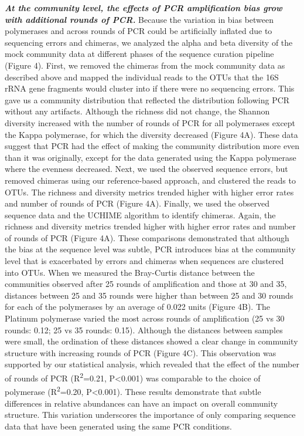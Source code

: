 \documentclass[11pt,]{article}
\begin{document}
\textbf{\emph{At the community level, the effects of PCR amplification
bias grow with additional rounds of PCR.}} Because the variation in bias
between polymerases and across rounds of PCR could be artificially
inflated due to sequencing errors and chimeras, we analyzed the alpha
and beta diversity of the mock community data at different phases of the
sequence curation pipeline (Figure 4). First, we removed the chimeras
from the mock community data as described above and mapped the
individual reads to the OTUs that the 16S rRNA gene fragments would
cluster into if there were no sequencing errors. This gave us a
community distribution that reflected the distribution following PCR
without any artifacts. Although the richness did not change, the Shannon
diversity increased with the number of rounds of PCR for all polymerases
except the Kappa polymerase, for which the diversity decreased (Figure
4A). These data suggest that PCR had the effect of making the community
distribution more even than it was originally, except for the data
generated using the Kappa polymerase where the evenness decreased. Next,
we used the observed sequence errors, but removed chimeras using our
reference-based approach, and clustered the reads to OTUs. The richness
and diversity metrics trended higher with higher error rates and number
of rounds of PCR (Figure 4A). Finally, we used the observed sequence
data and the UCHIME algorithm to identify chimeras. Again, the richness
and diversity metrics trended higher with higher error rates and number
of rounds of PCR (Figure 4A). These comparisons demonstrated that
although the bias at the sequence level was subtle, PCR introduces bias
at the community level that is exacerbated by errors and chimeras when
sequences are clustered into OTUs. When we measured the Bray-Curtis
distance between the communities observed after 25 rounds of
amplification and those at 30 and 35, distances between 25 and 35 rounds
were higher than between 25 and 30 rounds for each of the polymerases by
an average of 0.022 units (Figure 4B). The Platinum polymerase varied
the most across rounds of amplification (25 vs 30 rounds: 0.12; 25 vs 35
rounds: 0.15). Although the distances between samples were small, the
ordination of these distances showed a clear change in community
structure with increasing rounds of PCR (Figure 4C). This observation
was supported by our statistical analysis, which revealed that the
effect of the number of rounds of PCR (R\textsuperscript{2}=0.21,
P\textless{}0.001) was comparable to the choice of polymerase
(R\textsuperscript{2}=0.20, P\textless{}0.001). These results
demonstrate that subtle differences in relative abundances can have an
impact on overall community structure. This variation underscores the
importance of only comparing sequence data that have been generated
using the same PCR conditions.
\end{document}
